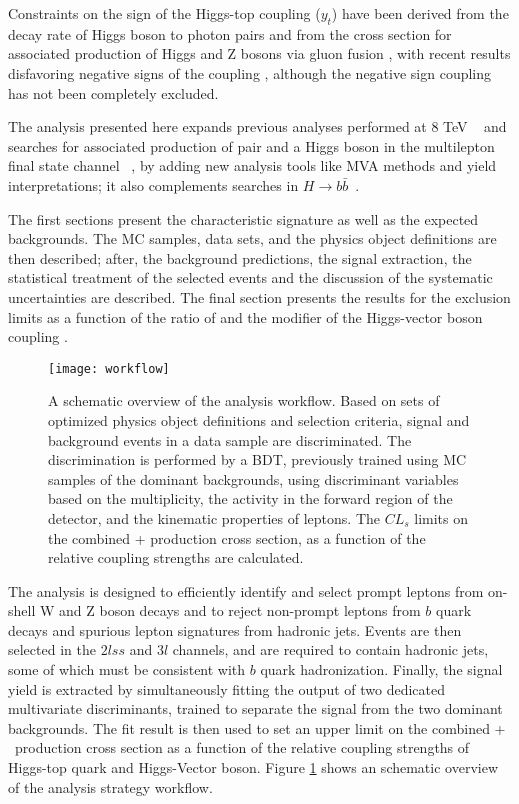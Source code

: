 Constraints on the sign of the Higgs-top coupling ($y_t$) have been derived from the decay rate of Higgs boson to photon pairs \cite{biswas} and from the cross section for associated production of Higgs and Z bosons via gluon fusion \cite{hespel}, with recent results disfavoring negative signs of the coupling \cite{cms_ht_couplings,comb_ht_couplings,diboson}, although the negative sign coupling has not been completely excluded.

The analysis presented here expands previous analyses performed at 8 TeV ~\cite{Khachatryan_2015,CMS_AN_2014-140} and searches for associated production of \ttbar pair and a Higgs boson in the multilepton final state channel ~\cite{CMS_AN_2016-211}, by adding new analysis tools like MVA methods and yield interpretations; it also complements searches in $H\to b\bar{b}$~\cite{CMS_PAS_HIG_16-019}.

The first sections present the characteristic \tHq signature as well as the expected backgrounds. The MC samples, data sets, and the physics object definitions are then described; after, the background predictions, the signal extraction, the statistical treatment of the selected events and the discussion of the systematic uncertainties are described. The final section presents the results for the exclusion limits as a function of the ratio of \Ct and the modifier of the Higgs-vector boson coupling \CV.  

\begin{figure}[!h]
\begin{center}
\texttt{[image: workflow]}
\end{center}
\caption[Analysis strategy workflow]{A schematic overview of the analysis workflow. Based on sets of optimized physics object definitions and selection criteria, signal and background events in a data sample are discriminated. The discrimination is performed by a BDT, previously trained using MC samples of the dominant backgrounds, using discriminant variables based on the \bjet multiplicity, the activity in the forward region of the detector, and the kinematic properties of leptons. The $CL_s$ limits on the combined \ttH + \tH production cross section, as a function of the relative coupling strengths are calculated. }
\label{fig:workflow}
\end{figure}

The analysis is designed to efficiently identify and select prompt leptons from on-shell W and Z boson decays and to reject non-prompt leptons from $b$ quark decays and spurious lepton signatures from hadronic jets. Events are then selected in the $2lss$ and $3l$ channels, and are required to contain hadronic jets, some of which must be consistent with $b$ quark hadronization. Finally, the signal yield is extracted by simultaneously fitting the output of two dedicated multivariate discriminants, trained to separate the \tHq signal from the two dominant backgrounds. The fit result is then used to set an upper limit on the combined \ttH + \tH\ production cross section as a function of the relative coupling strengths of Higgs-top quark and Higgs-Vector boson. Figure \ref{fig:workflow} shows an schematic overview of the analysis strategy workflow. 

